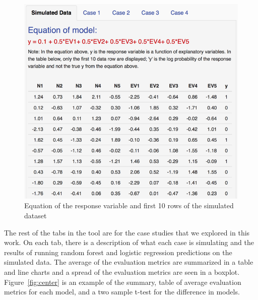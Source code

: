 \documentclass{llncs}
\begin{document}
\begin{figure}
\centering
\includegraphics[scale=0.75]{dataset.png}
\caption{Equation of the response variable and first 10 rows of the simulated dataset}
\label{fig:dataset}
\end{figure}

\noindent 
The rest of the tabs in the tool are for the case studies that we explored in this work.  On each tab, there is a description of what each case is simulating and the results of running random forest and logistic regression predictions on the simulated data.  The average of the evaluation metrics are summarized in a table and line charts and a spread of the evaluation metrics are seen in a boxplot. Figure~\ref{fig:center} is an example of the summary, table of average evaluation metrics for each model, and a two sample t-test for the difference in models.
\end{document}
